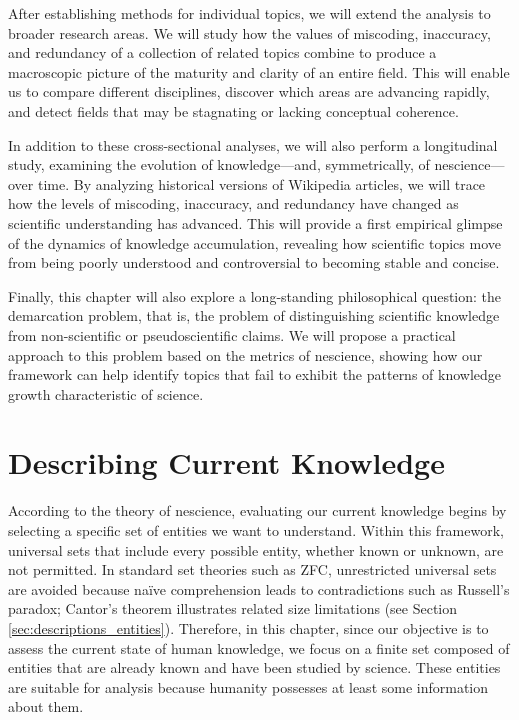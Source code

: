 After establishing methods for individual topics, we will extend the analysis to broader research areas. We will study how the values of miscoding, inaccuracy, and redundancy of a collection of related topics combine to produce a macroscopic picture of the maturity and clarity of an entire field. This will enable us to compare different disciplines, discover which areas are advancing rapidly, and detect fields that may be stagnating or lacking conceptual coherence.

In addition to these cross-sectional analyses, we will also perform a longitudinal study, examining the evolution of knowledge—and, symmetrically, of nescience—over time. By analyzing historical versions of Wikipedia articles, we will trace how the levels of miscoding, inaccuracy, and redundancy have changed as scientific understanding has advanced. This will provide a first empirical glimpse of the dynamics of knowledge accumulation, revealing how scientific topics move from being poorly understood and controversial to becoming stable and concise.

Finally, this chapter will also explore a long-standing philosophical question: the demarcation problem, that is, the problem of distinguishing scientific knowledge from non-scientific or pseudoscientific claims. We will propose a practical approach to this problem based on the metrics of nescience, showing how our framework can help identify topics that fail to exhibit the patterns of knowledge growth characteristic of science.

%
%
\section{Describing Current Knowledge}

According to the theory of nescience, evaluating our current knowledge begins by selecting a specific set of entities we want to understand. Within this framework, universal sets that include every possible entity, whether known or unknown, are not permitted. In standard set theories such as ZFC, unrestricted universal sets are avoided because naïve comprehension leads to contradictions such as Russell's paradox; Cantor's theorem illustrates related size limitations (see Section \ref{sec:descriptions_entities}). Therefore, in this chapter, since our objective is to assess the current state of human knowledge, we focus on a finite set composed of entities that are already known and have been studied by science. These entities are suitable for analysis because humanity possesses at least some information about them.

